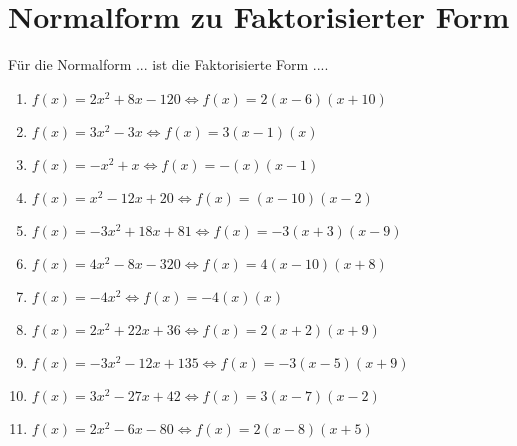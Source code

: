 \documentclass{article}%
\begin{document}
\section{Normalform zu Faktorisierter Form}%
\label{sec:NormalformzuFaktorisierterForm}%
Für die Normalform ... ist die Faktorisierte Form ....%
\begin{enumerate}[label=\alph*)]%
\item%
\newline\vspace{0.5cm}$f(x)=2x^2 + 8x - 120\Leftrightarrow f(x)=2(x-6)(x+10)$%
\item%
\newline\vspace{0.5cm}$f(x)=3x^2 - 3x\Leftrightarrow f(x)=3(x-1)(x)$%
\item%
\newline\vspace{0.5cm}$f(x)=-x^2 + x\Leftrightarrow f(x)=-(x)(x-1)$%
\item%
\newline\vspace{0.5cm}$f(x)=x^2 - 12x + 20\Leftrightarrow f(x)=(x-10)(x-2)$%
\item%
\newline\vspace{0.5cm}$f(x)=-3x^2 + 18x + 81\Leftrightarrow f(x)=-3(x+3)(x-9)$%
\item%
\newline\vspace{0.5cm}$f(x)=4x^2 - 8x - 320\Leftrightarrow f(x)=4(x-10)(x+8)$%
\item%
\newline\vspace{0.5cm}$f(x)=-4x^2\Leftrightarrow f(x)=-4(x)(x)$%
\item%
\newline\vspace{0.5cm}$f(x)=2x^2 + 22x + 36\Leftrightarrow f(x)=2(x+2)(x+9)$%
\item%
\newline\vspace{0.5cm}$f(x)=-3x^2 - 12x + 135\Leftrightarrow f(x)=-3(x-5)(x+9)$%
\item%
\newline\vspace{0.5cm}$f(x)=3x^2 - 27x + 42\Leftrightarrow f(x)=3(x-7)(x-2)$%
\item%
\newline\vspace{0.5cm}$f(x)=2x^2 - 6x - 80\Leftrightarrow f(x)=2(x-8)(x+5)$%

\end{enumerate}
\end{document}
